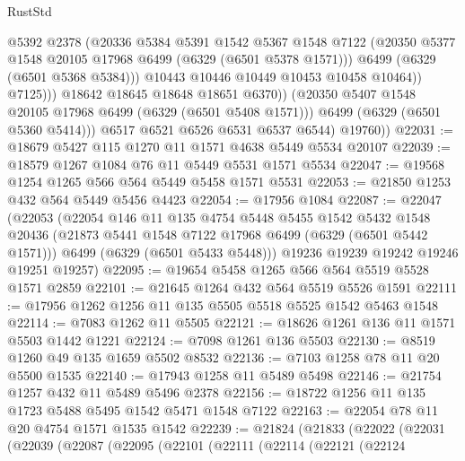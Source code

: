 \begin{lexlean}{RustStd}
\begin{coremodule}
{{                          @5392
                          @2378
                          (@20336
                            @5384
                            @5391
                            @1542
                            @5367
                            @1548
                            @7122
                            (@20350 @5377 @1548 @20105 @17968 @6499 (@6329 (@6501 @5378 @1571)))
                            @6499
                            (@6329 (@6501 @5368 @5384)))
                          @10443
                          @10446
                          @10449
                          @10453
                          @10458
                          @10464))
                      @7125)))
                @18642
                @18645
                @18648
                @18651
                @6370))
            (@20350 @5407 @1548 @20105 @17968 @6499 (@6329 (@6501 @5408 @1571)))
            @6499
            (@6329 (@6501 @5360 @5414)))
          @6517
          @6521
          @6526
          @6531
          @6537
          @6544)
        @19760))
@22031 := @18679 @5427 @115 @1270 @11 @1571 @4638 @5449 @5534 @20107
@22039 := @18579 @1267 @1084 @76 @11 @5449 @5531 @1571 @5534
@22047 := @19568 @1254 @1265 @566 @564 @5449 @5458 @1571 @5531
@22053 := @21850 @1253 @432 @564 @5449 @5456 @4423
@22054 := @17956 @1084
@22087 := @22047
    (@22053
      (@22054
        @146
        @11
        @135
        @4754
        @5448
        @5455
        @1542
        @5432
        @1548
        @20436
        (@21873 @5441 @1548 @7122 @17968 @6499 (@6329 (@6501 @5442 @1571)))
        @6499
        (@6329 (@6501 @5433 @5448)))
      @19236
      @19239
      @19242
      @19246
      @19251
      @19257)
@22095 := @19654 @5458 @1265 @566 @564 @5519 @5528 @1571 @2859
@22101 := @21645 @1264 @432 @564 @5519 @5526 @1591
@22111 := @17956 @1262 @1256 @11 @135 @5505 @5518 @5525 @1542 @5463 @1548
@22114 := @7083 @1262 @11 @5505
@22121 := @18626 @1261 @136 @11 @1571 @5503 @1442 @1221
@22124 := @7098 @1261 @136 @5503
@22130 := @8519 @1260 @49 @135 @1659 @5502 @8532
@22136 := @7103 @1258 @78 @11 @20 @5500 @1535
@22140 := @17943 @1258 @11 @5489 @5498
@22146 := @21754 @1257 @432 @11 @5489 @5496 @2378
@22156 := @18722 @1256 @11 @135 @1723 @5488 @5495 @1542 @5471 @1548 @7122
@22163 := @22054 @78 @11 @20 @4754 @1571 @1535 @1542
@22239 := @21824
    (@21833
      (@22022
        (@22031
          (@22039
            (@22087
              (@22095
                (@22101
                  (@22111
                    (@22114
                      (@22121
                        (@22124
}}
\end{coremodule}
\end{lexlean}
